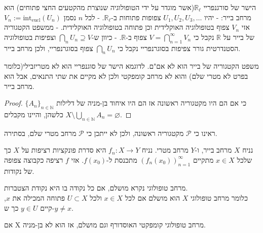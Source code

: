 \documentclass{tstextbook}
\begin{document}
\begin{example}
הישר של סורגנפריי \(\mathbb{R}_{\ell}\)(אשר מוגדר על ידי הטופולוגיה שנוצרת מהקטעים החצי פתוחים) הוא מרחב בייר:
- יהיו \(U_{1},U_{2},U_{3},\dots\) צפופות פתוחות ב-\(\mathbb{R}_{\ell}\).
- לכל \(n\) נסמן \(V_{n}:= \mathrm{int}_{\text{eucl}}(U_{n})\) אזי \(V_{n}\) צפוף בטופולוגיה האוקלידית וכן פתוחה בטופולוגיה האוקלידית. 
- ממשפט הקטגוריה של בייר על \(\mathbb{R}\) נקבל כי \(V=\bigcap_{n=1}^{\infty}V_{n}\) צפוף ב-\(\mathbb{R}\). 
- כיוון ש-\(\bigcap_{n}U_{n}\supseteq V\) וצפיפות בטופולוגיה הסטנדרטית גורר צפיפות בסוגרנפריי נקבל כי \(\bigcap_{n}U_{n}\) צפוף בסוגרנפריי, ולכן מרחב בייר.

\end{example}
\begin{corollary}
משפט הקטגוריה של בייר הוא לא אם"ם. לדוגמא הישר של סוגנפריי הוא לא מטריזבילי(כלומר בפרט לא מטרי שלם) והוא לא מרחב קומפקטי ולכן לא מקיים את שתי התנאים, אבל הוא מרחב בייר.

\end{corollary}
\begin{proof}
כי אם הם היו מקטגוריה ראשונה אז הם היו איחוד בן-מניה של דלילות \(\{A_{n}\}_{n\in\mathbb{N}}\) כלשהן, והיינו מקבלים \(X\setminus\bigcup_{n\in\mathbb{N}}A_{n}=\varnothing\).

\end{proof}
\begin{example}
ראינו כי \(\mathcal{P}\) מקטגוריה ראשונה, ולכן לא ייתכן כי \(\mathcal{P}\) מרחב מטרי שלם, בסתירה.

\end{example}
\begin{example}
נניח \(X\) מרחב בייר, ו-\(Y\) מרחב מטרי. נניח \(f_{n}:X\to Y\) היא סדרת פונקציות רציפות על \(X\) כך שלכל \(x \in X\) מתקיים \((f_{n}(x_{0}))_{n=1}^{\infty}\) מתכנסת ל-\(f(x_{0})\). אזי \(f\) רציפה כקבוצה צפופה של נקודות.

\end{example}
\begin{definition}
מרחב טופולוגי נקרא מושלם, אם כל נקודה בו היא נקודת הצטברות.\\

כלומר מרחב טופולוגי \(X\) הוא מושלם אם לכל \(x\in X\) ולכל \(U\subset X\) פתוחה המכילה את \(x\), קיים \(y\in U\) כך ש-\(y\ne x\).  

\end{definition}
\begin{corollary}
אם X מרחב טופולוגי קומפקטי האוסדורף וגם מושלם, אז הוא לא בן-מניה.

\end{corollary}
\end{document}
